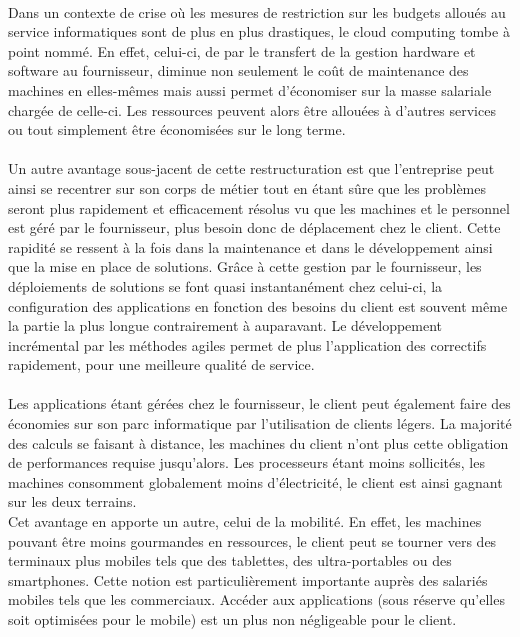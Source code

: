 \documentclass[a4paper,12pt]{report}
\begin{document}
\begin{onehalfspace}
	\paragraph*{}
	Dans un contexte de crise où les mesures de restriction sur les budgets alloués au service informatiques sont de plus en plus drastiques, le cloud computing tombe à point nommé. En effet, celui-ci, de par le transfert de la gestion hardware et software au fournisseur, diminue non seulement le coût de maintenance des machines en elles-mêmes mais aussi permet d’économiser sur la masse salariale chargée de celle-ci. Les ressources peuvent alors être allouées à d’autres services ou tout simplement être économisées sur le long terme.

	\paragraph*{}
	Un autre avantage sous-jacent de cette restructuration est que l’entreprise peut ainsi se recentrer sur son corps de métier tout en étant sûre que les problèmes seront plus rapidement et efficacement résolus vu que les machines et le personnel est géré par le fournisseur, plus besoin donc de déplacement chez le client. Cette rapidité se ressent à la fois dans la maintenance et dans le développement ainsi que la mise en place de solutions. Grâce à cette gestion par le fournisseur, les déploiements de solutions se font quasi instantanément chez celui-ci, la configuration des applications en fonction des besoins du client est souvent même la partie la plus longue contrairement à auparavant. Le développement incrémental par les méthodes agiles permet de plus l’application des correctifs rapidement, pour une meilleure qualité de service.	

	\paragraph*{}
	Les applications étant gérées chez le fournisseur, le client peut également faire des économies sur son parc informatique par l’utilisation de clients légers. La majorité des calculs se faisant à distance, les machines du client n’ont plus cette obligation de performances requise jusqu’alors. Les processeurs étant moins sollicités, les machines consomment globalement moins d’électricité, le client est ainsi gagnant sur les deux terrains.\\
Cet avantage en apporte un autre, celui de la mobilité. En effet, les machines pouvant être moins gourmandes en ressources, le client peut se tourner vers des terminaux plus mobiles tels que des tablettes, des ultra-portables ou des smartphones. Cette notion est particulièrement importante auprès des salariés mobiles tels que les commerciaux. Accéder aux applications (sous réserve qu’elles soit optimisées pour le mobile) est un plus non négligeable pour le client.



\end{onehalfspace}
\end{document}
